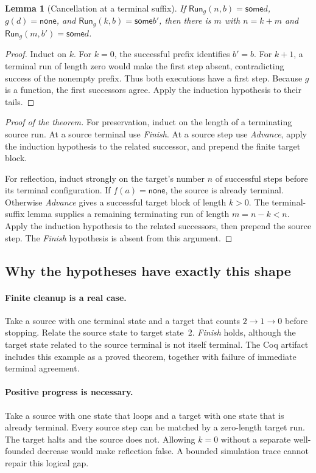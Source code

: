 \documentclass[11pt,letterpaper]{article}
\newcommand{\Run}{\mathsf{Run}}
\newcommand{\Some}{\mathsf{some}}
\newcommand{\None}{\mathsf{none}}
\newtheorem{lemma}[theorem]{Lemma}
\begin{document}
\begin{lemma}[Cancellation at a terminal suffix]
If $\Run_g(n,b)=\Some d$, $g(d)=\None$, and
$\Run_g(k,b)=\Some b'$, then there is $m$ with
$n=k+m$ and $\Run_g(m,b')=\Some d$.
\end{lemma}
\begin{proof}
Induct on $k$. For $k=0$, the successful prefix identifies $b'=b$.
For $k+1$, a terminal run of length zero would make the first step absent,
contradicting success of the nonempty prefix. Thus both executions have a first
step. Because $g$ is a function, the first successors agree. Apply the induction
hypothesis to their tails.
\end{proof}

\begin{proof}[Proof of the theorem]
For preservation, induct on the length of a terminating source run. At a source
terminal use \emph{Finish}. At a source step use \emph{Advance}, apply the induction
hypothesis to the related successor, and prepend the finite target block.

For reflection, induct strongly on the target's number $n$ of successful steps
before its terminal configuration. If $f(a)=\None$, the source is already terminal.
Otherwise \emph{Advance} gives a successful target block of length $k>0$. The
terminal-suffix lemma supplies a remaining terminating run of length $m=n-k<n$.
Apply the induction hypothesis to the related successors, then prepend the source
step. The \emph{Finish} hypothesis is absent from this argument.
\end{proof}

\subsection{Why the hypotheses have exactly this shape}

\paragraph{Finite cleanup is a real case.}
Take a source with one terminal state and a target that counts $2\to1\to0$ before
stopping. Relate the source state to target state~2. \emph{Finish} holds, although
the target state related to the source terminal is not itself terminal. The Coq
artifact includes this example as a proved theorem, together with failure of
immediate terminal agreement.

\paragraph{Positive progress is necessary.}
Take a source with one state that loops and a target with one state that is already
terminal. Every source step can be matched by a zero-length target run. The target
halts and the source does not. Allowing $k=0$ without a separate well-founded
decrease would make reflection false. A bounded simulation trace cannot repair this
logical gap.
\end{document}

